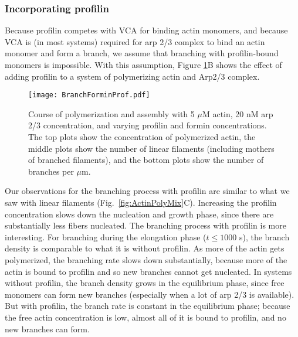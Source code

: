 \documentclass[11pt]{article}
\begin{document}
\subsubsection{Incorporating profilin}
Because profilin competes with VCA for binding actin monomers, and because VCA is (in most systems) required for arp 2/3 complex to bind an actin monomer and form a branch, we assume that branching with profilin-bound monomers is impossible. With this assumption, Figure \ref{fig:Arp20ForminProf}B shows the effect of adding profilin to a system of polymerizing actin and Arp2/3 complex.

\begin{figure}
\centering
\texttt{[image: BranchForminProf.pdf]}
\caption{\label{fig:Arp20ForminProf}Course of polymerization and assembly with 5 $\mu$M actin, 20 nM arp 2/3 concentration, and varying profilin and formin concentrations.  The top plots show the concentration of polymerized actin, the middle plots show the number of linear filaments (including mothers of branched filaments), and the bottom plots show the number of branches per $\mu$m. }
\end{figure}


Our observations for the branching process with profilin are similar to what we saw with linear filaments (Fig.\ \ref{fig:ActinPolyMix}C). Increasing the profilin concentration slows down the nucleation and growth phase, since there are substantially less fibers nucleated. The branching process with profilin is more interesting. For branching during the elongation phase ($t \leq 1000$ s), the branch density is comparable to what it is without profilin. As more of the actin gets polymerized, the branching rate slows down substantially, because more of the actin is bound to profilin and so new branches cannot get nucleated. In systems without profilin, the branch density grows in the equilibrium phase, since free monomers can form new branches (especially when a lot of arp 2/3 is available). But with profilin, the branch rate is constant in the equilibrium phase; because the free actin concentration is low, almost all of it is bound to profilin, and no new branches can form. 
\end{document}
